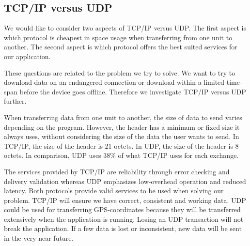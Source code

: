 \subsection{TCP/IP versus UDP}
We would like to consider two aspects of TCP/IP versus UDP. The first aspect is which protocol is cheapest in space usage when transferring from one unit to another. The second aspect is which protocol offers the best suited services for our application.

These questions are related to the problem we try to solve. We want to try to download data on an endangered connection or download within a limited time-span before the device goes offline. Therefore we investigate TCP/IP versus UDP further.

When transferring data from one unit to another, the size of data to send varies depending on the program. However, the header has a minimum or fixed size it always uses, without considering the size of the data the user wants to send. In TCP/IP, the size of the header is 21 octets\cite{tcpdesc}. In UDP, the size of the header is 8 octets\cite{udpdesc}. In comparison, UDP uses 38\% of what TCP/IP uses for each exchange.

The services provided by TCP/IP are reliability through error checking and delivery validation whereas UDP emphasizes low-overhead operation and reduced latency\cite{wiki-tcp}. Both protocols provide valid services to be used when solving our problem. TCP/IP will ensure we have correct, consistent and working data. UDP could be used for transferring GPS-coordinates because they will be transferred extensively when the application is running. Losing an UDP transaction will not break the application. If a few data is lost or inconsistent, new data will be sent in the very near future.